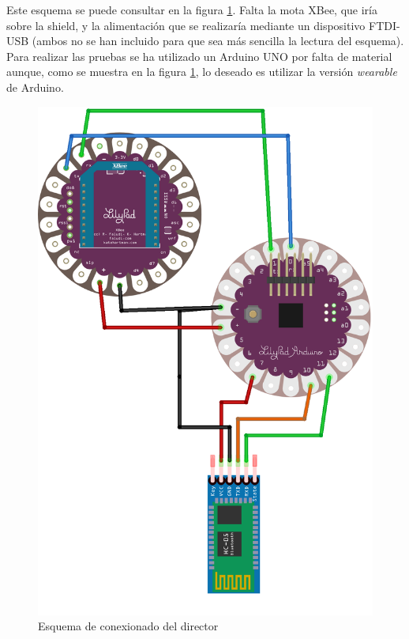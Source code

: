 Este esquema se puede consultar en la figura \ref{fig:director_esquema}. Falta
la mota XBee, que iría sobre la shield, y la alimentación que se realizaría mediante un
dispositivo FTDI-USB (ambos no se han incluido para que sea más sencilla la lectura del
esquema).\\

Para realizar las pruebas se ha utilizado un Arduino UNO por falta de material aunque,
como se muestra en la figura \ref{fig:director_esquema}, lo deseado es utilizar la
versión \textit{wearable} de Arduino.

\begin{figure}[!htb]
\centering
\includegraphics[width=1\textwidth]{./imagenes/director_esquema}
\caption{Esquema de conexionado del director} \label{fig:director_esquema}
\end{figure}

